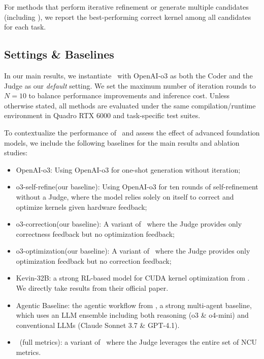 For methods that perform iterative refinement or generate multiple candidates (including \agentname), we report the best-performing correct kernel among all candidates for each task.


\subsection{Settings \& Baselines}
In our main results, we instantiate \agentname~with OpenAI-o3 as both the Coder and the Judge as our {\it default} setting.  
We set the maximum number of iteration rounds to $N{=}10$ to balance performance improvements and inference cost.  
Unless otherwise stated, all methods are evaluated under the same compilation/runtime environment in Quadro RTX 6000 and task-specific test suites. 

To contextualize the performance of \agentname~and assess the effect of advanced foundation models, we include the following baselines for the main results and ablation studies:

\begin{itemize}

    \item OpenAI-o3: Using OpenAI-o3 for one-shot generation without iteration;  
    \item o3-self-refine(our baseline): Using OpenAI-o3 for ten rounds of self-refinement without a Judge, where the model relies solely on itself to correct and optimize kernels given hardware feedback;  
    \item o3-correction(our baseline): A variant of \agentname~where the Judge provides only correctness feedback but no optimization feedback;  
    \item o3-optimization(our baseline): A variant of \agentname~where the Judge provides only optimization feedback but no correction feedback;  
    \item Kevin-32B: a strong RL-based model for CUDA kernel optimization from \citep{kevin-multi-turn-rl}. We directly take results from their official paper.  
    \item Agentic Baseline: the agentic workflow from \citep{lange2025robustagenticcudakernel}, a strong multi-agent baseline, which uses an LLM ensemble including both
reasoning (o3 \& o4-mini) and conventional LLMs (Claude Sonnet 3.7 \& GPT-4.1).
    \item \agentname~(full metrics): a variant of \agentname~where the Judge leverages the entire set of NCU metrics.
\end{itemize}


